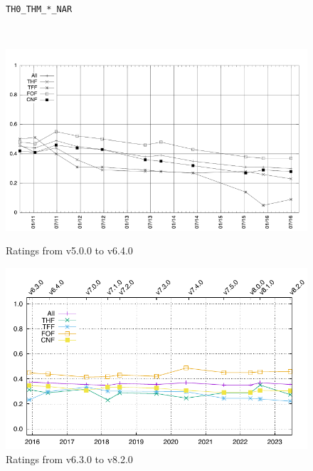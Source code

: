 \documentclass[runningheads]{llncs}
\begin{document}
\begin{figure}[t!]
\begin{minipage}[t]{.49\textwidth}
  \vspace*{-2em}
  \caption{{\tt TH0\_THM\_*\_NAR}}
  \label{Plot_TH0_THM_NAR}
\end{minipage}
\\
\begin{minipage}[t]{.49\textwidth}
  \centering
  \includegraphics[width=\textwidth]{Plots/RatingsDecline_v5.0.0_v6.4.0.pdf}
  \vspace*{-2em}
  \caption{Ratings from v5.0.0 to v6.4.0}
  \label{Ratings_v5.0.0_v6.4.0}
\end{minipage}
\begin{minipage}[t]{.49\textwidth}
  \centering
  \includegraphics[width=\textwidth]{Plots/RatingsDecline_v6.3.0_v8.2.0.pdf}
  \vspace*{-2em}
  \caption{Ratings from v6.3.0 to v8.2.0}
  \label{Ratings_v6.3.0_v8.2.0}
\end{minipage}
\end{figure}

\end{document}
